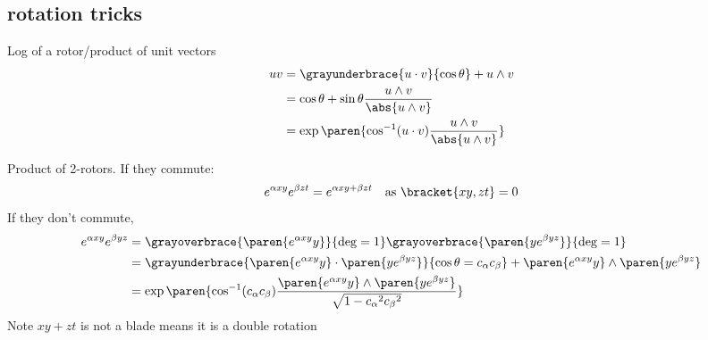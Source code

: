 \documentclass[draft]{scrartcl}
\begin{document}
\begin{multicols*}{2}
\section{rotation tricks}
Log of a rotor/product of unit vectors
\begin{align*}
  uv &= \grayunderbrace{u\cdot v}{\cos\theta} + u\wedge v  \\
     &= \cos\theta + \sin\theta \frac{u\wedge v}{\abs{u\wedge v}} \\
     &= \exp\paren{\cos^{-1}(u\cdot v) \frac{u\wedge v}{\abs{u\wedge v}}}
\end{align*}

Product of 2-rotors. If they commute:
\[
  e^{\alpha xy} e^{\beta zt} = e^{\alpha xy + \beta zt} \quad \text{as } \bracket{xy,zt} = 0
\]
If they don't commute,
\begin{align*}
  e^{\alpha xy} e^{\beta yz}
  &= \grayoverbrace{\paren{e^{\alpha xy} y}}{\deg=1}\grayoverbrace{\paren{ye^{\beta yz}}}{\deg=1} \\
  &=\grayunderbrace{\paren{e^{\alpha xy} y} \cdot \paren{ye^{\beta yz}}}{\cos \theta=c_\alpha c_\beta} + \paren{e^{\alpha xy} y} \wedge \paren{ye^{\beta yz}} \\
  &=\exp\paren{\cos^{-1}(c_\alpha c_\beta) \frac{\paren{e^{\alpha xy}y}\wedge\paren{ye^{\beta yz}}}{\sqrt{1-{c_\alpha}^2{c_\beta}^2}}}
\end{align*}
Note \(xy+zt\) is not a blade means it is a double rotation


\end{multicols*}
\end{document}

